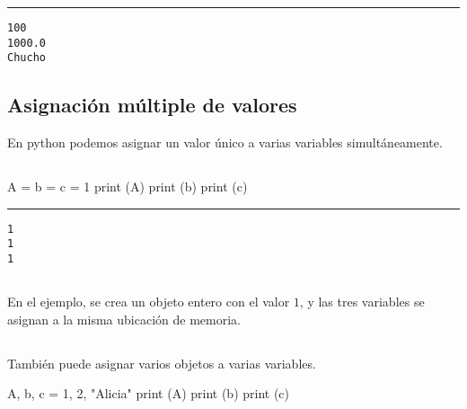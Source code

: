 \documentclass[]{article}
\newenvironment{Shaded}{}{}
\newcommand{\DecValTok}[1]{\textcolor[rgb]{0.25,0.63,0.44}{#1}}
\newcommand{\StringTok}[1]{\textcolor[rgb]{0.25,0.44,0.63}{#1}}
\newcommand{\OperatorTok}[1]{\textcolor[rgb]{0.40,0.40,0.40}{#1}}
\newcommand{\BuiltInTok}[1]{#1}
\newcommand{\NormalTok}[1]{#1}
\begin{document}
\begin{center}\rule{0.5\linewidth}{\linethickness}\end{center}

\begin{verbatim}
100
1000.0
Chucho
\end{verbatim}

\subsection{Asignación múltiple de
valores}\label{asignaciuxf3n-muxfaltiple-de-valores}

En python podemos asignar un valor único a varias variables
simultáneamente.

\subsection{}\label{section-11}

\begin{Shaded}
\begin{Highlighting}[]
\NormalTok{A }\OperatorTok{=}\NormalTok{ b }\OperatorTok{=}\NormalTok{ c }\OperatorTok{=} \DecValTok{1}
\BuiltInTok{print}\NormalTok{ (A)}
\BuiltInTok{print}\NormalTok{ (b)}
\BuiltInTok{print}\NormalTok{ (c)}
\end{Highlighting}
\end{Shaded}

\begin{center}\rule{0.5\linewidth}{\linethickness}\end{center}

\begin{verbatim}
1
1
1
\end{verbatim}

\subsection{}\label{section-12}

En el ejemplo, se crea un objeto entero con el valor \(1\), y las tres
variables se asignan a la misma ubicación de memoria.

\subsection{}\label{section-13}

También puede asignar varios objetos a varias variables.

\begin{Shaded}
\begin{Highlighting}[]
\NormalTok{A, b, c }\OperatorTok{=} \DecValTok{1}\NormalTok{, }\DecValTok{2}\NormalTok{, }\StringTok{"Alicia"}
\BuiltInTok{print}\NormalTok{ (A)}
\BuiltInTok{print}\NormalTok{ (b)}
\BuiltInTok{print}\NormalTok{ (c)}
\end{Highlighting}
\end{Shaded}
\end{document}
